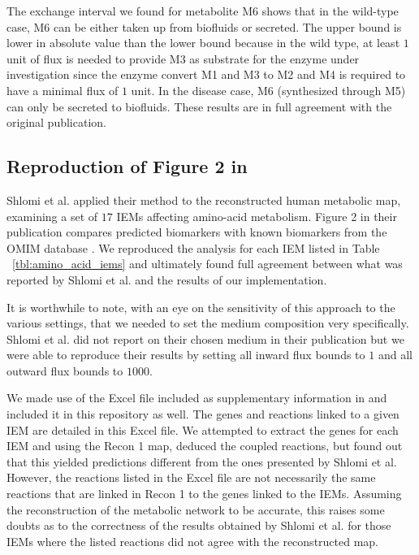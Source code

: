 \documentclass[10pt,a4paper,onecolumn]{article}
\begin{document}
The exchange interval we found for metabolite M6 shows that in the
wild-type case, M6 can be either taken up from biofluids or secreted.
The upper bound is lower in absolute value than the lower bound because
in the wild type, at least \(1\) unit of flux is needed to provide M3 as
substrate for the enzyme under investigation since the enzyme convert M1
and M3 to M2 and M4 is required to have a minimal flux of \(1\) unit. In
the disease case, M6 (synthesized through M5) can only be secreted to
biofluids. These results are in full agreement with the original
publication.

\subsection{\texorpdfstring{Reproduction of Figure 2 in
\autocite{Shlomi2009}}{Reproduction of Figure 2 in {[}@Shlomi2009{]}}}\label{reproduction-of-figure-2-in-shlomi2009}

Shlomi et al. applied their method to the reconstructed human metabolic
map, examining a set of \(17\) IEMs affecting amino-acid metabolism.
Figure 2 in their publication compares predicted biomarkers with known
biomarkers from the OMIM database \autocite{McKusick2007}. We reproduced
the analysis for each IEM listed in Table ~\ref{tbl:amino_acid_iems} and
ultimately found full agreement between what was reported by Shlomi et
al. and the results of our implementation.

It is worthwhile to note, with an eye on the sensitivity of this
approach to the various settings, that we needed to set the medium
composition very specifically. Shlomi et al. did not report on their
chosen medium in their publication but we were able to reproduce their
results by setting all inward flux bounds to \(1\) and all outward flux
bounds to \(1000\).

We made use of the Excel file included as supplementary information in
\autocite{Shlomi2009} and included it in this repository as well. The
genes and reactions linked to a given IEM are detailed in this Excel
file. We attempted to extract the genes for each IEM and using the Recon
1 map, deduced the coupled reactions, but found out that this yielded
predictions different from the ones presented by Shlomi et al. However,
the reactions listed in the Excel file are not necessarily the same
reactions that are linked in Recon 1 to the genes linked to the IEMs.
Assuming the reconstruction of the metabolic network to be accurate,
this raises some doubts as to the correctness of the results obtained by
Shlomi et al. for those IEMs where the listed reactions did not agree
with the reconstructed map.
\end{document}
